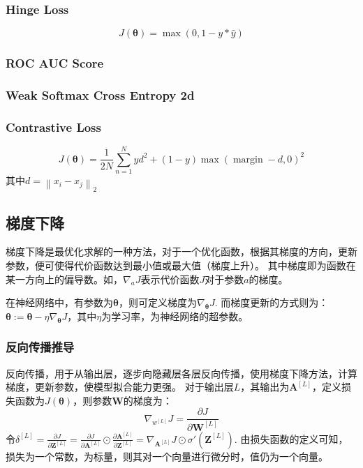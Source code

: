 \subsubsection{Hinge Loss}

\begin{equation}
  J(\boldsymbol{\theta})=\max (0,1-y * \hat{y})
\end{equation}

\subsubsection{ROC AUC Score}

\subsubsection{Weak Softmax Cross Entropy 2d}

\subsubsection{Contrastive Loss}
\begin{equation}
  J(\boldsymbol{\theta})=\frac{1}{2 N} \sum_{n=1}^{N} y d^{2}+(1-y) \max (\operatorname{margin}-d, 0)^{2}
\end{equation}
其中$d=\left\|x_{i}-x_{j}\right\|_{2}$

\subsection{梯度下降}
梯度下降是最优化求解的一种方法，对于一个优化函数，根据其梯度的方向，更新参数，便可使得代价函数达到最小值或最大值（梯度上升）。
其中梯度即为函数在某一方向上的偏导数。如，$\nabla _a J$表示代价函数$J$对于参数$a$的梯度。

在神经网络中，有参数为$\boldsymbol{\theta}$，则可定义梯度为$\nabla _{\boldsymbol{\theta}} J$. 而梯度更新的方式则为：$\boldsymbol{\theta} := \boldsymbol{\theta} - \eta \nabla_
{\boldsymbol{\theta}} J$，其中$\eta$为学习率，为神经网络的超参数。

\subsubsection{反向传播推导}
反向传播，用于从输出层，逐步向隐藏层各层反向传播，使用梯度下降方法，计算梯度，更新参数，使模型拟合能力更强。
对于输出层$L$，其输出为$\mathbf{A}^{[L]}$，定义损失函数为$J(\boldsymbol{\theta})$，则参数$\mathbf{W}$的梯度为：
\begin{equation}
  \nabla _{w^{[L]}} J = \frac{\partial J}{\partial \mathbf{W}^{[L]}}
  \label{eq:nabla_W}
\end{equation}
令$\delta ^{[L]} = \frac{\partial J}{\partial \mathbf{Z}^{[L]}} = \frac{\partial J}{\partial \mathbf{A}^{[L]}} \odot \frac{\partial \mathbf{A}^{[L]}}{\partial \mathbf{Z}^{[L]}} = \nabla _{\mathbf{A}^{[L]}} J \odot \sigma ' \left(\mathbf{Z}^{[L]}\right)$. 由损失函数的定义可知，损失为一个常数，为标量，则其对一个向量进行微分时，值仍为一个向量。

